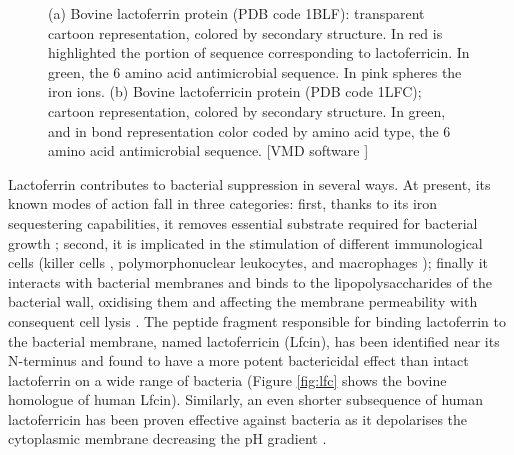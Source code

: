 \begin{figure}
\begin{center}
 \hspace{0.3cm}
\caption[Lactoferrin and lactoferricin proteins]{(a) Bovine lactoferrin protein (PDB code 1BLF): transparent cartoon representation, colored by secondary structure. In red is highlighted the portion of sequence corresponding to lactoferricin. In green, the 6 amino acid antimicrobial sequence. In pink spheres the iron ions. (b) Bovine lactoferricin protein (PDB code 1LFC); cartoon representation, colored by secondary structure. In green, and in bond representation color coded by amino acid type, the 6 amino acid antimicrobial sequence. [VMD software \citet{HUMP96}]} \label{fig:blf_lfc}
\end{center}
\end{figure}

Lactoferrin contributes to bacterial suppression in several ways. At present, its known modes of action fall in three categories: first, thanks to its iron sequestering capabilities, it removes essential substrate required for bacterial growth \citep{Farnaud2003}; second, it is implicated in the stimulation of different immunological cells (killer cells \citep{Shau1992}, polymorphonuclear leukocytes, and macrophages \citep{Gahr1991}); finally it interacts with bacterial membranes and binds to the lipopolysaccharides of the bacterial wall, oxidising them and affecting the membrane permeability with consequent cell lysis \citep{Farnaud2003}.
The peptide fragment responsible for binding lactoferrin to the bacterial membrane, named lactoferricin (Lfcin), has been identified near its N-terminus and found to have a more potent bactericidal effect than intact lactoferrin on a wide range of bacteria \citep{Gifford2005,Bellamy1992,Tomita1994,Wakabayashi1996} (Figure \ref{fig:lfc} shows the bovine homologue of human Lfcin).
%
Similarly, an even shorter subsequence of human lactoferricin has been proven effective against bacteria as it depolarises the cytoplasmic membrane decreasing the pH gradient \citep{Aguilera1999}.

